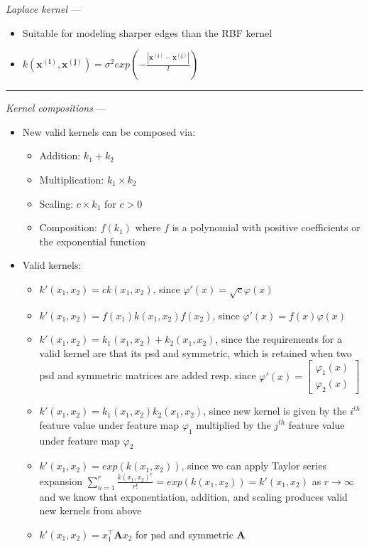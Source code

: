 \emph{Laplace kernel} ---
\begin{itemize}
    \item Suitable for modeling sharper edges than the RBF kernel
    \item $k( \boldsymbol{x^{(i)}}, \boldsymbol{x^{(j)}} ) = \sigma^2 exp (- \frac{ | \boldsymbol{x^{(i)}} - \boldsymbol{x^{(j)}} | }{ l } )$
\end{itemize}

{\color{lightgray}\hrule height 0.001mm}

\emph{Kernel compositions} ---
\begin{itemize}
    \item New valid kernels can be composed via:
    \begin{itemize}
        \item Addition: $k_1 + k_2$
        \item Multiplication: $k_1 \times k_2$
        \item Scaling: $c \times k_1$ for $c > 0$
        \item Composition: $f(k_1)$ where $f$ is a polynomial with positive coefficients or the exponential function
    \end{itemize}
    \item Valid kernels:
    \begin{itemize}
        \item $k'(x_1,x_2) = c k(x_1,x_2)$, since $\varphi'(x) = \sqrt{c}\varphi(x)$
        \item $k'(x_1,x_2) = f(x_1) k(x_1,x_2) f(x_2)$, since $\varphi'(x) = f(x)\varphi(x)$
        \item $k'(x_1,x_2) = k_1(x_1,x_2) + k_2(x_1,x_2)$, since the requirements for a valid kernel are that its psd and symmetric, which is retained when two psd and symmetric matrices are added resp. since $\varphi'(x) = 
        \begin{bmatrix} 
        \varphi_1(x)\\
        \varphi_2(x)
        \end{bmatrix}$
        \item $k'(x_1,x_2) = k_1(x_1,x_2) k_2(x_1,x_2)$, since new kernel is given by the $i^{th}$ feature value under feature map $\varphi_1$ multiplied by the $j^{th}$ feature value under feature map $\varphi_2$
        \item $k'(x_1,x_2) = exp(k(x_1,x_2))$, since we can apply Taylor series expansion $\sum_{n=1}^r \frac{k(x_1,x_2)^r}{r!} = exp(k(x_1,x_2)) = k'(x_1,x_2)$ as $r \rightarrow \infty$ and we know that exponentiation, addition, and scaling produces valid new kernels from above
        \item $k'(x_1,x_2) = x_1^\intercal \boldsymbol{A} x_2 $ for psd and symmetric $\boldsymbol{A}$
    \end{itemize}
\end{itemize}

